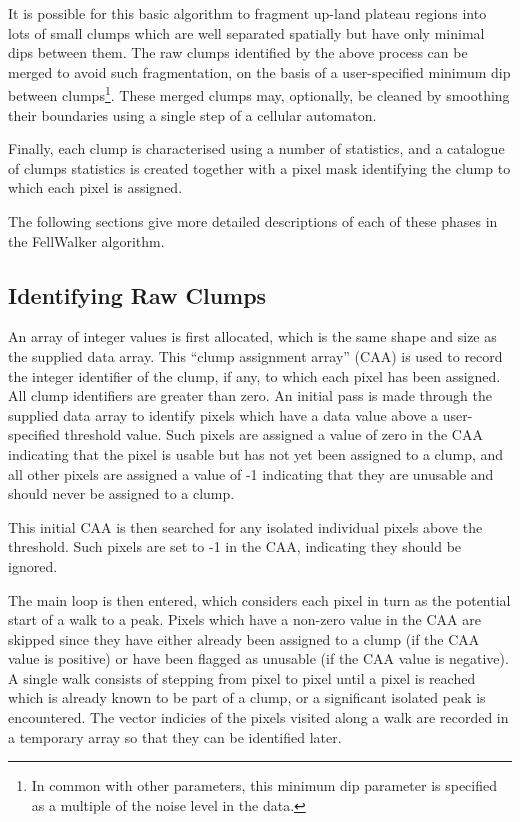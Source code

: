\documentclass[final,authoryear,5p,times,twocolumn]{elsarticle}
\begin{document}
It is possible for this basic algorithm to fragment up-land plateau
regions into lots of small clumps which are well separated spatially but
have only minimal dips between them. The raw clumps identified by the above
process can be merged to avoid such fragmentation, on the basis of a
user-specified minimum dip between clumps\footnote{In common with other
parameters, this minimum dip parameter is specified as a multiple of the
noise level in the data.}. These merged clumps may,
optionally, be cleaned by smoothing their boundaries using a single step
of a cellular automaton.

Finally, each clump is characterised using a number of statistics, and a
catalogue of clumps statistics is created together with a pixel mask
identifying the clump to which each pixel is assigned.

The following sections give more detailed descriptions of each of these
phases in the FellWalker algorithm.

\subsection{Identifying Raw Clumps}
An array of integer values is first allocated, which is the same shape
and size as the supplied data array. This ``clump assignment array''
(CAA) is used to record the integer identifier of the clump, if any, to
which each pixel has been assigned. All clump identifiers are greater
than zero. An initial pass is made through the supplied data array to
identify pixels which have a data value above a user-specified threshold
value. Such pixels are assigned a value of zero in the CAA indicating
that the pixel is usable but has not yet been assigned to a clump, and
all other pixels are assigned a value of -1 indicating that they are
unusable and should never be assigned to a clump.

This initial CAA is then searched for any isolated individual pixels
above the threshold. Such pixels are set to -1 in the CAA, indicating
they should be ignored.

The main loop is then entered, which considers each pixel in turn as the
potential start of a walk to a peak. Pixels which have a non-zero value
in the CAA are skipped since they have either already been assigned to a
clump (if the CAA value is positive) or have been flagged as unusable (if
the CAA value is negative). A single walk consists of stepping from pixel
to pixel until a pixel is reached which is already known to be part of a
clump, or a significant isolated peak is encountered. The vector indicies of
the pixels visited along a walk are recorded in a temporary array so that
they  can be identified later.
\end{document}
